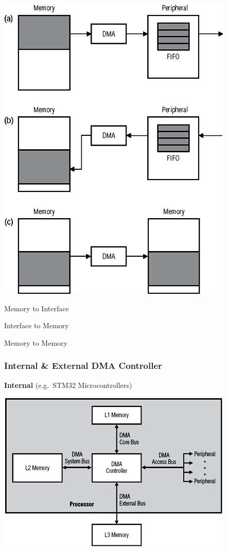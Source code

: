 \documentclass[
  10pt,
  a4paper,
]{article}
\begin{document}
\begin{multicols*}{2}
\includegraphics{images/performance/image-13.png}

\begin{description}[style=sameline,parsep=0mm,labelsep=4pt]
\item[\textbf{\texttt(a)}] Memory to Interface
\item[\textbf{\texttt(b)}] Interface to Memory
\item[\textbf{\texttt(c)}] Memory to Memory
\end{description}

\subsubsection{Internal \& External DMA
Controller}\label{internal-external-dma-controller}

\textbf{Internal} (e.g.~STM32 Microcontrollers)

\includegraphics{images/performance/image-14.png}


\end{multicols*}
\end{document}
